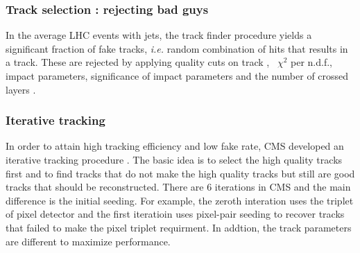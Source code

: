 \subsubsection{Track selection : rejecting bad guys }

In the average LHC events with jets, the track finder procedure yields 
a significant fraction of fake tracks, \textit{i.e.} random combination 
of hits that results in a track. These are rejected by applying 
quality cuts on track \Eta, \pt\, $\chi^2$ per n.d.f., impact parameters,
significance of impact parameters
and the number of crossed layers \cite{cmsnotetrackfilter}. 

\subsubsection{Iterative tracking}

In order to attain high tracking efficiency and low fake rate, 
CMS developed an iterative tracking procedure \cite{cmsnoteiterativetracking}. 
The basic idea is to select the high quality tracks first and 
to find tracks that do not make the high quality tracks 
but still are good tracks that should be reconstructed. 
There are 6 iterations in CMS and the main difference is 
the initial seeding. For example, the zeroth interation uses 
the triplet of pixel detector and the first iteratioin uses 
pixel-pair seeding to recover tracks that failed to make 
the pixel triplet requirment. In addtion, the track parameters 
are different to maximize performance.


